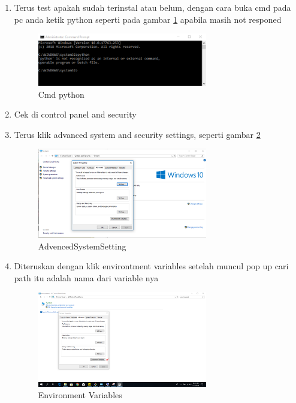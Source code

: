 \begin{enumerate}
	
\item	Terus test apakah sudah terinstal atau belum, dengan cara buka cmd pada pc anda ketik python seperti pada gambar \ref{cmd_python} apabila masih not responed
\begin{figure}[ht]
	\centerline{\includegraphics[width=0.70\textwidth]{figures/cmd_python.PNG}}
	\caption{Cmd python}
	\label{cmd_python}
\end{figure}
	
\item	Cek di control panel and security

	
\item	Terus klik advanced system and security settings, seperti gambar \ref{AdvencedSystemSetting}
\begin{figure}[ht] \centerline{\includegraphics[width=0.70\textwidth]{figures/AdvencedSystemSetting.PNG}}
	\caption{AdvencedSystemSetting}
	\label{AdvencedSystemSetting}
\end{figure}	

\item	Diteruskan dengan klik environtment variables setelah muncul pop up cari path itu adalah nama dari variable nya
\begin{figure}[ht]
	\centerline{\includegraphics[width=0.70\textwidth]{figures/environment_variables.PNG}}
	\caption{Environment Variables}
	\label{environment_variables}
\end{figure}
	

\end{enumerate}
